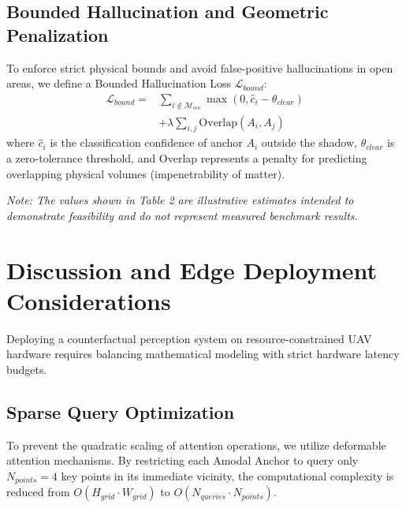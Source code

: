 \documentclass[10pt,conference,letterpaper,twocolumn]{article}
\begin{document}
\subsection{Bounded Hallucination and Geometric Penalization}
To enforce strict physical bounds and avoid false-positive hallucinations in open areas, we define a Bounded Hallucination Loss $\mathcal{L}_{bound}$:
\begin{align}
\mathcal{L}_{bound} = & \sum_{i \notin \mathcal{M}_{occ}} \max\left(0, \hat{c}_i - \theta_{clear}\right) \nonumber \\
& + \lambda \sum_{i, j} \text{Overlap}(A_i, A_j)
\end{align}
where $\hat{c}_i$ is the classification confidence of anchor $A_i$ outside the shadow, $\theta_{clear}$ is a zero-tolerance threshold, and Overlap represents a penalty for predicting overlapping physical volumes (impenetrability of matter).

\begin{table}[h]
\centering
\caption{Illustrative Edge Deployment Targets and Resource Budget Estimates on UAV Hardware.}
\label{tab:latency}
\begin{flushleft}
\small\textit{Note: The values shown in Table 2 are illustrative estimates intended to demonstrate feasibility and do not represent measured benchmark results.}
\end{flushleft}
\end{table}

\section{Discussion and Edge Deployment Considerations}
Deploying a counterfactual perception system on resource-constrained UAV hardware requires balancing mathematical modeling with strict hardware latency budgets.

\subsection{Sparse Query Optimization}
To prevent the quadratic scaling of attention operations, we utilize deformable attention mechanisms. By restricting each Amodal Anchor to query only $N_{points} = 4$ key points in its immediate vicinity, the computational complexity is reduced from $O(H_{grid} \cdot W_{grid})$ to $O(N_{queries} \cdot N_{points})$. 
\end{document}

